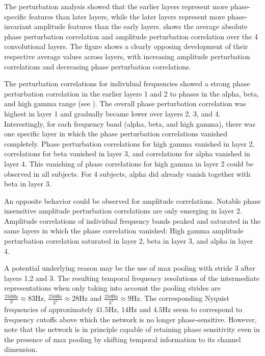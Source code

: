     The perturbation analysis showed that the earlier layers represent more
phase-specific features than later layers, while the later layers
represent more phase-invariant amplitude features than the early layers.
 shows the average absolute
phase perturbation correlation and amplitude perturbation correlation
over the 4 convolutional layers. The figure shows a clearly opposing
development of their respective average values across layers, with
increasing amplitude perturbation correlations and decreasing phase
perturbation correlations.

The perturbation correlations for individual frequencies showed a strong
phase perturbation correlation in the earlier layers 1 and 2 to phases
in the alpha, beta, and high gamma range (see
 ). The overall phase perturbation
correlation was highest in layer 1 and gradually became lower over
layers 2, 3, and 4. Interestingly, for each frequency band (alpha, beta,
and high gamma), there was one specific layer in which the phase
perturbation correlations vanished completely. Phase perturbation
correlations for high gamma vanished in layer 2, correlations for beta
vanished in layer 3, and correlations for alpha vanished in layer 4.
This vanishing of phase correlations for high gamma in layer 2 could be
observed in all subjects. For 4 subjects, alpha did already vanish
together with beta in layer 3.

An opposite behavior could be observed for amplitude correlations.
Notable phase insensitive amplitude perturbation correlations are only
emerging in layer 2. Amplitude correlations of individual frequency
bands peaked and saturated in the same layers in which the phase
correlation vanished: High gamma amplitude perturbation correlation
saturated in layer 2, beta in layer 3, and alpha in layer 4.

A potential underlying reason may be the use of max pooling with stride
3 after layers 1,2 and 3. The resulting temporal frequency resolutions
of the intermediate representations when only taking into account the
pooling strides are $\frac{250 \textrm{Hz}}{3} \approx 83\textrm{Hz}$,
$\frac{250 \textrm{Hz}}{3^2} \approx 28\textrm{Hz}$ and
$\frac{250 \textrm{Hz}}{3^3} \approx 9\textrm{Hz}$. The corresponding
Nyquist frequencies of approximately $41.5\textrm{Hz}$,
$14\textrm{Hz}$ and $4.5\textrm{Hz}$ seem to correspond to frequency
cutoffs above which the network is no longer phase-sensitive. However,
note that the network is in principle capable of retaining phase
sensitivity even in the presence of max pooling by shifting temporal
information to its channel dimension.

